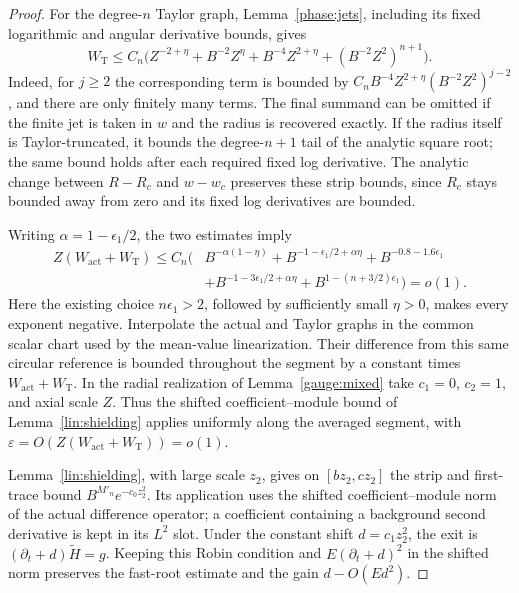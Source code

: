 \begin{proof}
For the degree-$n$ Taylor graph, Lemma~\ref{phase:jets}, including its
fixed logarithmic and angular derivative bounds, gives
\[
 W_{\mathrm{T}}\le C_n\bigl(
 Z^{-2+\eta}+B^{-2}Z^\eta+B^{-4}Z^{2+\eta}
 +(B^{-2}Z^2)^{n+1}\bigr).
\]
Indeed, for $j\ge2$ the corresponding term is bounded by
$C_nB^{-4}Z^{2+\eta}(B^{-2}Z^2)^{j-2}$, and there are only finitely
many terms.  The final summand can be omitted if the finite jet is taken
in $w$ and the radius is recovered exactly.  If the radius itself is
Taylor-truncated, it bounds the degree-$n+1$ tail of the analytic square
root; the same bound holds after each required fixed log derivative.
The analytic change between $R-R_c$ and $w-w_c$ preserves these strip
bounds, since $R_c$ stays bounded away from zero and its fixed log
derivatives are bounded.

Writing $\alpha=1-\epsilon_1/2$, the two estimates imply
\begin{align*}
 Z(W_{\mathrm{act}}+W_{\mathrm{T}})\le C_n\bigl(&
 B^{-\alpha(1-\eta)}
 +B^{-1-\epsilon_1/2+\alpha\eta}
 +B^{-0.8-1.6\epsilon_1}\\
 &+B^{-1-3\epsilon_1/2+\alpha\eta}
 +B^{1-(n+3/2)\epsilon_1}\bigr)=o(1).
\end{align*}
Here the existing choice $n\epsilon_1>2$, followed by sufficiently
small $\eta>0$, makes every exponent negative.  Interpolate the actual
and Taylor graphs in the common scalar chart used by the mean-value
linearization.  Their difference from this same circular reference is
bounded throughout the segment by a constant times
$W_{\mathrm{act}}+W_{\mathrm{T}}$.  In the radial realization of
Lemma~\ref{gauge:mixed} take $c_1=0$, $c_2=1$, and axial scale $Z$.
Thus the shifted coefficient--module bound of Lemma~\ref{lin:shielding}
applies uniformly along the averaged segment, with
$\varepsilon=O(Z(W_{\mathrm{act}}+W_{\mathrm{T}}))=o(1)$.


Lemma~\ref{lin:shielding}, with large scale $z_2$, gives on
$[bz_2,cz_2]$ the strip and first-trace bound
$B^{M'_n}e^{-c_0z_2^2}$.
Its application uses the shifted coefficient--module norm of the actual
difference operator; a coefficient containing a background second
derivative is kept in its $L^2$ slot.  Under the constant shift
$d=c_1z_2^2$, the exit is $(\partial_t+d)\widetilde H=g$.
Keeping this Robin condition and $E(\partial_t+d)^2$ in the shifted
norm preserves the fast-root estimate and the gain $d-O(Ed^2)$.


\end{proof}
